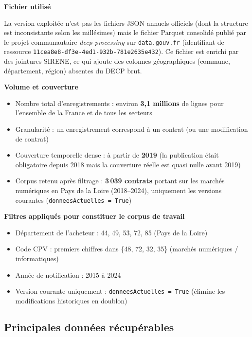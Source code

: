 \documentclass[12pt,a4paper]{article}
\begin{document}
\medskip
\textbf{Fichier utilisé}

La version exploitée n'est pas les fichiers JSON annuels officiels (dont la
structure est inconsistante selon les millésimes) mais le fichier Parquet
consolidé publié par le projet communautaire \textit{decp-processing} sur
\texttt{data.gouv.fr} (identifiant de ressource \texttt{11cea8e8-df3e-4ed1-932b-781e2635e432}).
Ce fichier est enrichi par des jointures SIRENE, ce qui ajoute des colonnes
géographiques (commune, département, région) absentes du DECP brut.

\medskip
\textbf{Volume et couverture}

\begin{itemize}
  \item[---] Nombre total d'enregistrements : environ \textbf{3,1 millions} de
    lignes pour l'ensemble de la France et de tous les secteurs
  \item[---] Granularité : un enregistrement correspond à un contrat (ou une
    modification de contrat)
  \item[---] Couverture temporelle dense : à partir de \textbf{2019} (la
    publication était obligatoire depuis 2018 mais la couverture réelle est
    quasi nulle avant 2019)
  \item[---] Corpus retenu après filtrage : \textbf{3\,039 contrats} portant
    sur les marchés numériques en Pays de la Loire (2018--2024), uniquement
    les versions courantes (\texttt{donneesActuelles = True})
\end{itemize}

\medskip
\textbf{Filtres appliqués pour constituer le corpus de travail}

\begin{itemize}
  \item[---] Département de l'acheteur : 44, 49, 53, 72, 85 (Pays de la Loire)
  \item[---] Code CPV : premiers chiffres dans \{48, 72, 32, 35\}
    (marchés numériques / informatiques)
  \item[---] Année de notification : 2015 à 2024
  \item[---] Version courante uniquement : \texttt{donneesActuelles = True}
    (élimine les modifications historiques en doublon)
\end{itemize}

\subsection{Principales données récupérables}
\end{document}
